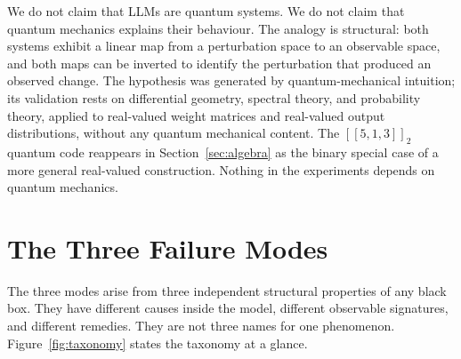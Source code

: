 \documentclass[11pt,a4paper]{article}
\newcommand{\Ccode}[3]{[\![#1,#2,#3]\!]}
\begin{document}
We do not claim that LLMs are quantum systems. We do not claim that quantum mechanics explains their behaviour. The analogy is structural: both systems exhibit a linear map from a perturbation space to an observable space, and both maps can be inverted to identify the perturbation that produced an observed change. The hypothesis was generated by quantum-mechanical intuition; its validation rests on differential geometry, spectral theory, and probability theory, applied to real-valued weight matrices and real-valued output distributions, without any quantum mechanical content. The $\Ccode{5}{1}{3}_2$ quantum code reappears in Section~\ref{sec:algebra} as the binary special case of a more general real-valued construction. Nothing in the experiments depends on quantum mechanics.


\section{The Three Failure Modes}
\label{sec:modes}

The three modes arise from three independent structural properties of any black box. They have different causes inside the model, different observable signatures, and different remedies. They are not three names for one phenomenon. Figure~\ref{fig:taxonomy} states the taxonomy at a glance.
\end{document}
